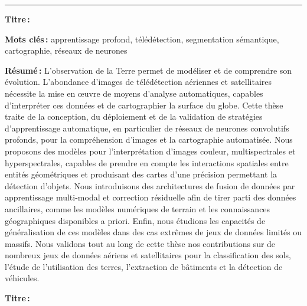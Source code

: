 {\begin{titlepage}
{\color{rulepink}\rule{\textwidth}{0.2cm}}

\bigskip

\begin{minipage}{\textwidth}
\large{}\selectfont
{\color{textpink} \textbf{Titre\,:}}~~\@title

\bigskip

\textbf{Mots clés\,:} apprentissage profond, télédétection, segmentation sémantique, cartographie, réseaux de neurones
\begin{multicols}{2}
\textbf{Résumé\,:}
L'observation de la Terre permet de modéliser et de comprendre son évolution. L'abondance d'images de télédétection aériennes et satellitaires nécessite la mise en œuvre de moyens d'analyse automatiques, capables d'interpréter ces données et de cartographier la surface du globe. Cette thèse traite de la conception, du déploiement et de la validation de stratégies d'apprentissage automatique, en particulier de réseaux de neurones convolutifs profonds, pour la compréhension d'images et la cartographie automatisée. Nous proposons des modèles pour l'interprétation d'images couleur, multispectrales et hyperspectrales, capables de prendre en compte les interactions spatiales entre entités géométriques et produisant des cartes d'une précision permettant la détection d'objets. Nous introduisons des architectures de fusion de données par apprentissage multi-modal et correction résiduelle afin de tirer parti des données ancillaires, comme les modèles numériques de terrain et les connaissances géographiques disponibles a priori. Enfin, nous étudions les capacités de généralisation de ces modèles dans des cas extrêmes de jeux de données limités ou massifs. Nous validons tout au long de cette thèse nos contributions sur de nombreux jeux de données aériens et satellitaires pour la classification des sols, l'étude de l'utilisation des terres, l'extraction de bâtiments et la détection de véhicules.

\end{multicols}
\end{minipage}
\vspace{4em}

\bigskip

\begin{minipage}{\textwidth}
\large{}\selectfont
{\color{textpink} \textbf{Titre\,:}}~~\@titleen

\bigskip


\end{minipage}
\end{titlepage}}
